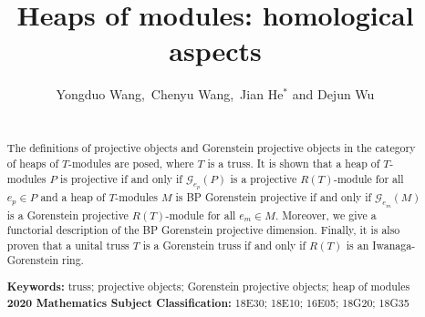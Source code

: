 \documentclass[11pt, twoside]{article}
\renewcommand{\cal}{\mathcal}
\begin{document}
\baselineskip=15pt
\title{\Large{\bf Heaps of modules: homological aspects
 }}
\medskip
\author{Yongduo Wang,~Chenyu Wang,~Jian He$^\ast$ and Dejun Wu}
\date{}
\maketitle
\def\blue{\color{blue}}
\def\red{\color{red}}

\newtheorem{theorem}{Theorem}[section]
\newtheorem{lemma}[theorem]{Lemma}
\newtheorem{corollary}[theorem]{Corollary}
\newtheorem{proposition}[theorem]{Proposition}
\newtheorem{conjecture}{Conjecture}
\theoremstyle{definition}
\newtheorem{definition}[theorem]{Definition}
\newtheorem{question}[theorem]{Question}
\newtheorem{notation}[theorem]{Notation}
\newtheorem{remark}[theorem]{Remark}
\newtheorem{remark*}[]{Remark}
\newtheorem{example}[theorem]{Example}
\newtheorem{example*}[]{Example}

\newtheorem{construction}[theorem]{Construction}
\newtheorem{construction*}[]{Construction}

\newtheorem{assumption}[theorem]{Assumption}
\newtheorem{assumption*}[]{Assumption}

\baselineskip=17pt
\parindent=0.5cm




\begin{abstract}
\noindent \\[0.3cm]
The definitions of projective objects and Gorenstein projective objects in the category of heaps of $T$-modules are posed, where $T$ is a truss. It is shown that a heap of $T$-modules $P$ is projective if and only if $\mathcal{G}_{e_p}(P)$ is a projective $R(T)$-module for all $e_p\in P$ and a heap of $T$-modules $M$ is BP Gorenstein projective if and only if $\mathcal{G}_{e_m}(M)$ is a Gorenstein projective $R(T)$-module for all $e_m\in M$. Moreover, we give a functorial description of the BP Gorenstein projective dimension. Finally, it is also proven that a unital truss $T$ is a Gorenstein truss if and only if $R(T)$ is an Iwanaga-Gorenstein ring.


\noindent \textbf{Keywords:} truss; projective objects; Gorenstein projective objects; heap of modules\\[0.1cm]
\textbf{2020 Mathematics Subject Classification:} 18E30; 18E10; 16E05; 18G20; 18G35
\medskip
\end{abstract}
{\footnotesize\tableofcontents}
\medskip
\end{document}
